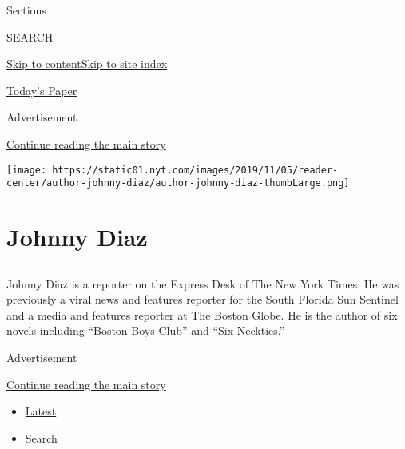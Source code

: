 Sections

SEARCH

\protect\hyperlink{site-content}{Skip to
content}\protect\hyperlink{site-index}{Skip to site index}

\href{https://myaccount.nytimes.com/auth/login?response_type=cookie\&client_id=vi}{}

\href{https://www.nytimes.com/section/todayspaper}{Today's Paper}

Advertisement

\protect\hyperlink{after-top}{Continue reading the main story}

\texttt{[image: https://static01.nyt.com/images/2019/11/05/reader-center/author-johnny-diaz/author-johnny-diaz-thumbLarge.png]}

\hypertarget{johnny-diaz}{%
\section{Johnny Diaz}\label{johnny-diaz}}

\subsection{}

Johnny Diaz is a reporter on the Express Desk of The New York Times. He
was previously a viral news and features reporter for the South Florida
Sun Sentinel and a media and features reporter at The Boston Globe. He
is the author of six novels including ``Boston Boys Club'' and ``Six
Neckties.''

Advertisement

\protect\hyperlink{after-mid1}{Continue reading the main story}

\begin{itemize}
\tightlist
\item
  \protect\hyperlink{stream-panel}{Latest}
\item
  Search
\end{itemize}

